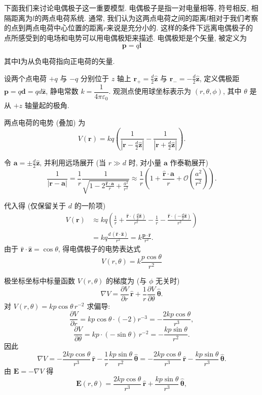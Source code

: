 下面我们来讨论电偶极子这一重要模型. 电偶极子是指一对电量相等, 符号相反, 相隔距离为$l$的两点电荷系统. 通常, 我们认为这两点电荷之间的距离$l$相对于我们考察的点到两点电荷中心位置的距离$r$来说是充分小的. 这样的条件下远离电偶极子的点所感受到的电场和电势可以用电偶极矩来描述. 电偶极矩是个矢量, 被定义为
\[
\mathbf{p} = q \mathbf{l}
\]

其中$\mathbf{l}$为从负电荷指向正电荷的矢量.

设两个点电荷 $+q$ 与 $-q$ 分别位于 $z$ 轴上 $\mathbf{r}_+=\frac{d}{2}\hat{\mathbf{z}}$ 与 $\mathbf{r}_-=-\frac{d}{2}\hat{\mathbf{z}}$, 定义偶极距 $\mathbf{p}=q\mathbf{d}=q d\hat{\mathbf{z}}$, 静电常数 $k=\dfrac{1}{4\pi\varepsilon_0}$. 观测点使用球坐标表示为 $(r,\theta,\phi)$, 其中 $\theta$ 是从 $+z$ 轴量起的极角.

两点电荷的电势 (叠加) 为
\[
V(\mathbf{r})=kq\left(\frac{1}{|\mathbf{r}-\frac{d}{2}\hat{\mathbf{z}}|}
-\frac{1}{|\mathbf{r}+\frac{d}{2}\hat{\mathbf{z}}|}\right).
\]

令 $\mathbf{a}=\pm\frac{d}{2}\hat{\mathbf{z}}$, 并利用远场展开 (当 $r\gg d$ 时, 对小量 $\mathbf{a}$ 作泰勒展开)
\[
\frac{1}{|\mathbf{r}-\mathbf{a}|}
=\frac{1}{r}\frac{1}{\sqrt{1-2\frac{\hat{\mathbf{r}}\cdot\mathbf{a}}{r}+\frac{a^2}{r^2}}}
\approx \frac{1}{r}\left(1+\frac{\hat{\mathbf{r}}\cdot\mathbf{a}}{r}+\mathcal{O}\!\left(\frac{a^2}{r^2}\right)\right).
\]

代入得 (仅保留关于 $d$ 的一阶项)
\[
\begin{aligned}
V(\mathbf{r})
&\approx kq\left(\frac{1}{r}+\frac{\hat{\mathbf{r}}\cdot(\tfrac{d}{2}\hat{\mathbf{z}})}{r^2}
-\frac{1}{r}-\frac{\hat{\mathbf{r}}\cdot(-\tfrac{d}{2}\hat{\mathbf{z}})}{r^2}\right) \\
&= kq\frac{d\,(\hat{\mathbf{r}}\cdot\hat{\mathbf{z}})}{r^2}
= k\frac{\mathbf{p}\cdot\hat{\mathbf{r}}}{r^2}.
\end{aligned}
\]
由于 $\hat{\mathbf{r}}\cdot\hat{\mathbf{z}}=\cos\theta$, 得电偶极子的电势表达式
\[
\,V(r,\theta)=k\frac{p\cos\theta}{r^{2}}\,
\]

极坐标坐标中标量函数 $V(r,\theta)$ 的梯度为 (与 $\phi$ 无关时)
\[
\nabla V = \frac{\partial V}{\partial r}\,\hat{\mathbf{r}}
+ \frac{1}{r}\frac{\partial V}{\partial \theta}\,\hat{\boldsymbol{\theta}}.
\]
对 $V(r,\theta)=k p\cos\theta\,r^{-2}$ 求偏导:
\[
\frac{\partial V}{\partial r}
= k p\cos\theta\cdot(-2)r^{-3} = -\frac{2k p\cos\theta}{r^{3}},
\]
\[
\frac{\partial V}{\partial \theta}
= k p\cdot(-\sin\theta)\,r^{-2} = -\frac{k p\sin\theta}{r^{2}}.
\]
因此
\[
\nabla V = -\frac{2k p\cos\theta}{r^{3}}\,\hat{\mathbf{r}}
- \frac{1}{r}\frac{k p\sin\theta}{r^{2}}\,\hat{\boldsymbol{\theta}}
= -\frac{2k p\cos\theta}{r^{3}}\,\hat{\mathbf{r}}
- \frac{k p\sin\theta}{r^{3}}\,\hat{\boldsymbol{\theta}}.
\]
由 $\mathbf{E}=-\nabla V$ 得
\[
\mathbf{E}(r,\theta)=\frac{2k p\cos\theta}{r^{3}}\,\hat{\mathbf{r}}
+ \frac{k p\sin\theta}{r^{3}}\,\hat{\boldsymbol{\theta}},
\]

